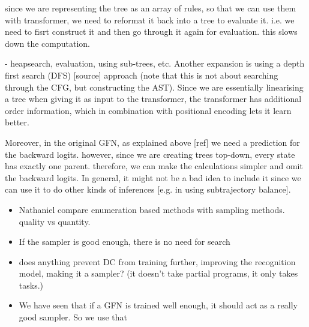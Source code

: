 since we are representing the tree as an array of rules, so that we can use them with transformer, we need to reformat it back into a tree to evaluate it. i.e. we need to fisrt construct it and then go through it again for evaluation. this slows down the computation. 


- heapsearch, evaluation, using sub-trees, etc. 
Another expansion is using a depth first search (DFS) [source] approach (note that this is not about searching through the CFG, but constructing the AST). Since we are essentially linearising a tree when giving it as input to the transformer, the transformer has additional order information, which in combination with positional encoding lets it learn better. 

Moreover, in the original GFN, as explained above [ref] we need a prediction for the backward logits. however, since we are creating trees top-down, every state has exactly one parent. therefore, we can make the calculations simpler and omit the backward logits. 
In general, it might not be a bad idea to include it since we can use it to do other kinds of inferences [e.g. in using subtrajectory balance].









\begin{itemize}
    \item Nathaniel compare enumeration based methods with sampling methods. quality vs quantity.
    \item If the sampler is good enough, there is no need for search
    \item does anything prevent DC from training further, improving the recognition model, making it a sampler? (it doesn't take partial programs, it only takes tasks.)
    \item We have seen that if a GFN is trained well enough, it should act as a really good sampler. So we use that 
\end{itemize}


